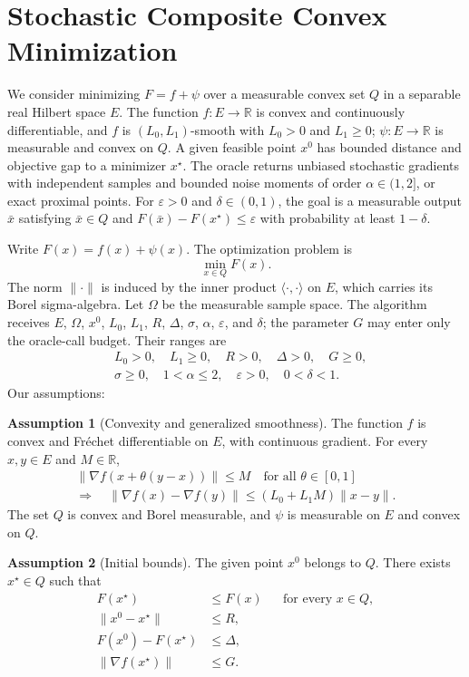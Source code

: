 \documentclass[10pt]{article}
\theoremstyle{definition}
\newtheorem{assumption}{Assumption}
\begin{document}
\section*{Stochastic Composite Convex Minimization}
We consider minimizing $F=f+\psi$ over a measurable convex set $Q$ in a separable real Hilbert space $E$. The function $f:E\to\mathbb{R}$ is convex and continuously differentiable, and $f$ is $(L_0,L_1)$-smooth with $L_0>0$ and $L_1\geq0$; $\psi:E\to\mathbb{R}$ is measurable and convex on $Q$. A given feasible point $x^0$ has bounded distance and objective gap to a minimizer $x^\star$. The oracle returns unbiased stochastic gradients with independent samples and bounded noise moments of order $\alpha\in(1,2]$, or exact proximal points. For $\varepsilon>0$ and $\delta\in(0,1)$, the goal is a measurable output $\bar{x}$ satisfying $\bar{x}\in Q$ and $F(\bar{x})-F(x^\star)\leq\varepsilon$ with probability at least $1-\delta$.

Write $F(x)=f(x)+\psi(x)$. The optimization problem is
\[
\min_{x\in Q} F(x).
\]
The norm $\|\cdot\|$ is induced by the inner product $\langle\cdot,\cdot\rangle$ on $E$, which carries its Borel sigma-algebra. Let $\Omega$ be the measurable sample space. The algorithm receives $E$, $\Omega$, $x^0$, $L_0$, $L_1$, $R$, $\Delta$, $\sigma$, $\alpha$, $\varepsilon$, and $\delta$; the parameter $G$ may enter only the oracle-call budget. Their ranges are
\[
\begin{aligned}
&L_0>0,\quad L_1\geq0,\quad R>0,\quad \Delta>0,\quad G\geq0,\\
&\sigma\geq0,\quad 1<\alpha\leq2,\quad \varepsilon>0,\quad 0<\delta<1.
\end{aligned}
\]
Our assumptions:
\begin{assumption}[Convexity and generalized smoothness]
The function $f$ is convex and Fr\'echet differentiable on $E$, with continuous gradient. For every $x,y\in E$ and $M\in\mathbb{R}$,
\[
\begin{gathered}
\bigl\|\nabla f(x+\theta(y-x))\bigr\|\leq M
\quad\text{for all }\theta\in[0,1]\\
\Longrightarrow\quad
\|\nabla f(x)-\nabla f(y)\|
\leq (L_0+L_1M)\|x-y\|.
\end{gathered}
\]
The set $Q$ is convex and Borel measurable, and $\psi$ is measurable on $E$ and convex on $Q$.
\end{assumption}

\begin{assumption}[Initial bounds]
The given point $x^0$ belongs to $Q$. There exists $x^\star\in Q$ such that
\[
\begin{aligned}
F(x^\star)&\leq F(x) &&\text{for every }x\in Q,\\
\|x^0-x^\star\|&\leq R,\\
F(x^0)-F(x^\star)&\leq\Delta,\\
\|\nabla f(x^\star)\|&\leq G.
\end{aligned}
\]
\end{assumption}
\end{document}
